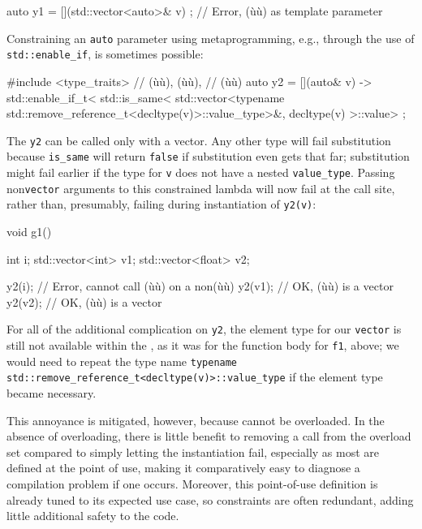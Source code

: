 {\begin{emcppslisting}
auto y1 = [](std::vector<auto>& v) { };  // Error, (ù{}ù) as template parameter
\end{emcppslisting}
    

\noindent Constraining an \lstinline!auto! parameter using metaprogramming, e.g.,
through the use of \lstinline!std::enable_if!, is sometimes possible:

\begin{emcppslisting}
#include <type_traits>  // (ù{}ù), (ù{}ù),
                        // (ù{}ù)
auto y2 = [](auto& v) -> std::enable_if_t<
    std::is_same<
        std::vector<typename std::remove_reference_t<decltype(v)>::value_type>&,
        decltype(v)
    >::value> { };
\end{emcppslisting}
    

\noindent The \lstinline!y2!  can be called only with a vector. Any
other type will fail substitution because \lstinline!is_same! will return
\lstinline!false! if substitution even gets that far; substitution might
fail earlier if the type for \lstinline!v! does not have a nested
\lstinline!value_type!. Passing non\lstinline!vector! arguments to this
constrained lambda will now fail at the call site, rather than,
presumably, failing during instantiation of \lstinline!y2(v)!:

\begin{emcppslisting}
void g1()
{
    int                i;
    std::vector<int>   v1;
    std::vector<float> v2;

    y2(i);   // Error, cannot call (ù{}ù) on a non(ù{}ù)
    y2(v1);  // OK, (ù{}ù) is a vector
    y2(v2);  // OK, (ù{}ù) is a vector
}
\end{emcppslisting}
    

\noindent For all of the additional complication on \lstinline!y2!, the element type
for our \lstinline!vector! is still not available within the , as it was for the function body for \lstinline!f1!, above; we would
need to repeat the type name \lstinline!typename!
\lstinline!std::remove_reference_t<decltype(v)>::value_type! if the
element type became necessary.

This annoyance is mitigated, however, because  cannot be overloaded. In the absence of overloading, there
is little benefit to removing a call from the overload set compared to
simply letting the instantiation fail, especially as most  are defined at the point of use, making it comparatively
easy to diagnose a compilation problem if one occurs. Moreover, this
point-of-use definition is already tuned to its expected use case, so
constraints are often redundant, adding little additional safety to the
code.

}
